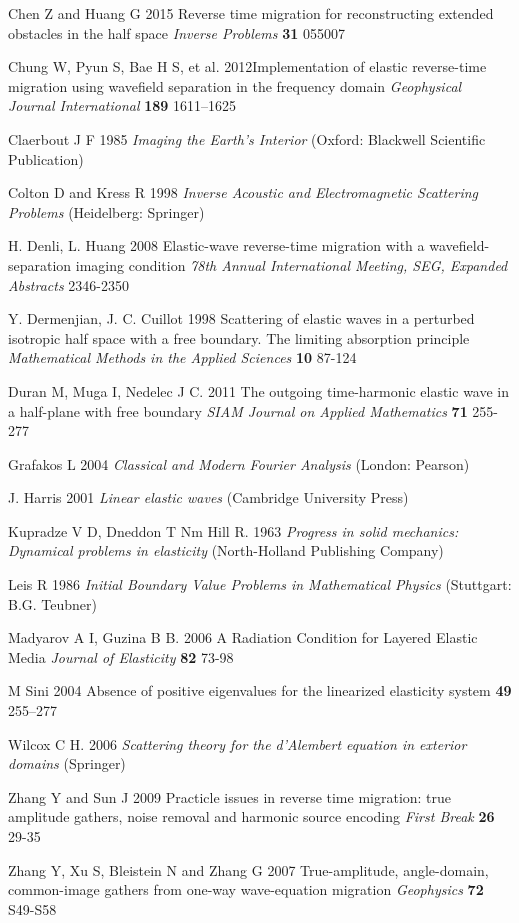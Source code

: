 \documentclass[11pt]{iopart}
\begin{document}
\begin{thebibliography}{99}
	Chen Z and  Huang G 2015 {Reverse time migration for reconstructing extended obstacles in the half space}  {\it Inverse Problems} {\bf 31 }  055007 
	
	Chung W, Pyun S, Bae H S, et al. 2012{Implementation of elastic reverse-time migration using wavefield separation in the frequency domain} {\it Geophysical Journal International} {\bf 189} 1611--1625
	
	{ Claerbout J F } 1985  { \em Imaging the Earth's Interior} (Oxford: Blackwell Scientific Publication)
	
	Colton D  and   Kress R 1998 {\em Inverse Acoustic and Electromagnetic Scattering Problems } (Heidelberg: Springer)
	
	H. Denli, L. Huang 2008
	{Elastic-wave reverse-time migration with a wavefield-separation imaging condition}
	{\it 78th Annual International Meeting, SEG, Expanded Abstracts} 2346-2350
	
	Y. Dermenjian, J. C. Cuillot 1998
	{Scattering of elastic waves in a perturbed isotropic half space with a free boundary. The limiting absorption principle}
	{\it Mathematical Methods in the Applied Sciences} {\bf 10} 87-124
	
	Duran M, Muga I, Nedelec J C. 2011
	{The outgoing time-harmonic elastic wave in a half-plane with free boundary}
	{\it SIAM Journal on Applied Mathematics} {\bf 71} 255-277
	
	{Grafakos L} 2004 {\em Classical and Modern Fourier Analysis } (London: Pearson)
	
	J. Harris 2001 {\em Linear elastic waves} {(Cambridge University Press)}
	
	Kupradze V D, Dneddon T Nm Hill R. 1963 {\em Progress in solid mechanics: Dynamical problems in elasticity} {(North-Holland Publishing Company)}
	
	{Leis R} 1986 {\em Initial Boundary Value Problems in Mathematical Physics} {(Stuttgart: B.G. Teubner)}
	
	Madyarov A I, Guzina B B. 2006 {A Radiation Condition for Layered Elastic Media} {\it Journal of Elasticity} {\bf 82} 73-98
	
	M Sini  2004 {Absence of positive eigenvalues for the linearized elasticity system} {\bf 49} 255--277
	
	{ Wilcox C H.} 2006 {\em Scattering theory for the d'Alembert equation in exterior domains}  {(Springer)}
	
	Zhang Y and Sun J 2009 {Practicle issues in reverse time migration: true amplitude gathers, noise removal and harmonic source encoding}
	{\it First Break} {\bf 26}  29-35
	
	Zhang Y, Xu S, Bleistein N and Zhang G 2007 {True-amplitude, angle-domain, common-image gathers from one-way wave-equation migration}
	{\it Geophysics} {\bf 72} S49-S58
	
\end{thebibliography}
\end{document}
